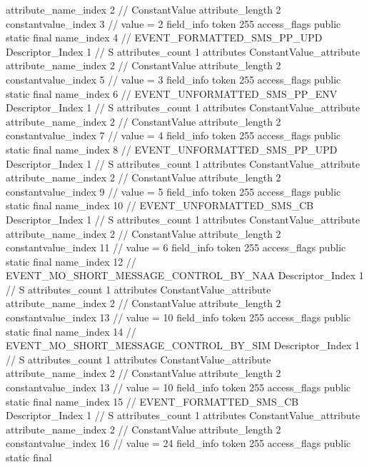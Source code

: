 {{{{{{{					attribute_name_index	2		// ConstantValue
					attribute_length	2
					constantvalue_index	3		// value = 2
				}
				}
			}
			field_info {
				token	255
				access_flags	public static final
				name_index	4		// EVENT_FORMATTED_SMS_PP_UPD
				Descriptor_Index	1		// S
				attributes_count	1
				attributes {
				ConstantValue_attribute {
					attribute_name_index	2		// ConstantValue
					attribute_length	2
					constantvalue_index	5		// value = 3
				}
				}
			}
			field_info {
				token	255
				access_flags	public static final
				name_index	6		// EVENT_UNFORMATTED_SMS_PP_ENV
				Descriptor_Index	1		// S
				attributes_count	1
				attributes {
				ConstantValue_attribute {
					attribute_name_index	2		// ConstantValue
					attribute_length	2
					constantvalue_index	7		// value = 4
				}
				}
			}
			field_info {
				token	255
				access_flags	public static final
				name_index	8		// EVENT_UNFORMATTED_SMS_PP_UPD
				Descriptor_Index	1		// S
				attributes_count	1
				attributes {
				ConstantValue_attribute {
					attribute_name_index	2		// ConstantValue
					attribute_length	2
					constantvalue_index	9		// value = 5
				}
				}
			}
			field_info {
				token	255
				access_flags	public static final
				name_index	10		// EVENT_UNFORMATTED_SMS_CB
				Descriptor_Index	1		// S
				attributes_count	1
				attributes {
				ConstantValue_attribute {
					attribute_name_index	2		// ConstantValue
					attribute_length	2
					constantvalue_index	11		// value = 6
				}
				}
			}
			field_info {
				token	255
				access_flags	public static final
				name_index	12		// EVENT_MO_SHORT_MESSAGE_CONTROL_BY_NAA
				Descriptor_Index	1		// S
				attributes_count	1
				attributes {
				ConstantValue_attribute {
					attribute_name_index	2		// ConstantValue
					attribute_length	2
					constantvalue_index	13		// value = 10
				}
				}
			}
			field_info {
				token	255
				access_flags	public static final
				name_index	14		// EVENT_MO_SHORT_MESSAGE_CONTROL_BY_SIM
				Descriptor_Index	1		// S
				attributes_count	1
				attributes {
				ConstantValue_attribute {
					attribute_name_index	2		// ConstantValue
					attribute_length	2
					constantvalue_index	13		// value = 10
				}
				}
			}
			field_info {
				token	255
				access_flags	public static final
				name_index	15		// EVENT_FORMATTED_SMS_CB
				Descriptor_Index	1		// S
				attributes_count	1
				attributes {
				ConstantValue_attribute {
					attribute_name_index	2		// ConstantValue
					attribute_length	2
					constantvalue_index	16		// value = 24
				}
				}
			}
			field_info {
				token	255
				access_flags	public static final
}}}}}
